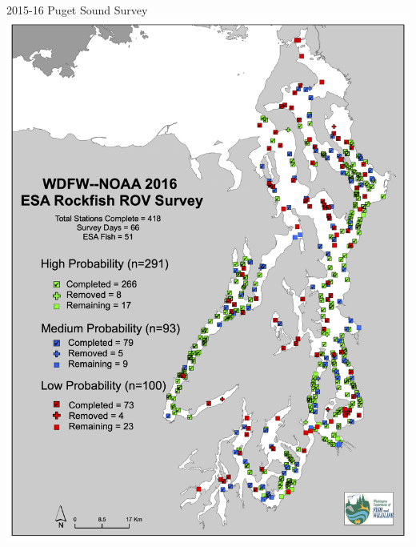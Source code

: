 \documentclass[
  ignorenonframetext,
]{beamer}
\begin{document}
\begin{frame}{2015-16 Puget Sound Survey}
\includegraphics[width=1\textwidth,height=\textheight]{2016_PS_map.png}
\end{frame}
\end{document}
